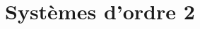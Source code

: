 \documentclass[10pt,fleqn]{article} %
\begin{document}
\section{Systèmes d'ordre 2}
%
%
%
%
%
%
%
%
%
%
%
%
%
%
%
\end{document}
